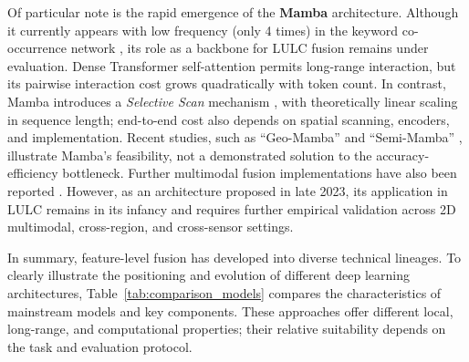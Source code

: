 \documentclass[]{interact}
\theoremstyle{plain}%
\theoremstyle{definition}
\theoremstyle{remark}
\DeclareRobustCommand{\DIFadd}[1]{{\protect\color{DIFaddcolor}\uwave{#1}}}
\DeclareRobustCommand{\DIFdel}[1]{{\protect\color{DIFdelcolor}\sout{#1}}}
\def\DIFadd#1{#1}%
\def\DIFdel#1{}%
\begin{document}
Of particular note is the rapid emergence of the \textbf{Mamba} architecture. Although it currently appears with low frequency (only 4 times) in the keyword co-occurrence network {\hypersetup{citecolor=red}\color{red}\citep{49,5,51,52}}, \DIFdel{it} \DIFdel{is} \DIFdel{positioning} \DIFdel{itself} \DIFadd{its} \DIFadd{role} as \DIFdel{the} \DIFdel{next-generation} \DIFadd{a} backbone \DIFdel{following} \DIFdel{CNN} \DIFdel{and} \DIFadd{for} \DIFadd{LULC} \DIFadd{fusion} \DIFadd{remains} \DIFadd{under} \DIFadd{evaluation}\DIFadd{.} \DIFadd{Dense} Transformer\DIFdel{.} \DIFdel{While} \DIFdel{Transformer} \DIFdel{possess} \DIFdel{superior} \DIFdel{global} \DIFdel{modeling} \DIFdel{capabilities} \DIFadd{self-attention} \DIFadd{permits} \DIFadd{long-range} \DIFadd{interaction}, \DIFdel{their} \DIFdel{computational} \DIFdel{complexity} \DIFadd{but} \DIFadd{its} \DIFadd{pairwise} \DIFadd{interaction} \DIFadd{cost} grows quadratically with \DIFdel{image} \DIFdel{resolution} \DIFadd{token} \DIFadd{count}. In contrast, Mamba introduces a \textit{Selective Scan} mechanism \citep{53}, \DIFdel{achieving} \DIFdel{a} \DIFdel{global} \DIFdel{receptive} \DIFdel{field} with \DIFadd{theoretically} linear \DIFdel{complexity} \DIFadd{scaling} \DIFadd{in} \DIFadd{sequence} \DIFadd{length}\DIFadd{;} \DIFadd{end-to-end} \DIFadd{cost} \DIFadd{also} \DIFadd{depends} \DIFadd{on} \DIFadd{spatial} \DIFadd{scanning}\DIFadd{,} \DIFadd{encoders}\DIFadd{,} \DIFadd{and} \DIFadd{implementation}. Recent studies, such as ``Geo-Mamba'' \citep{49} and ``Semi-Mamba'' \citep{51}, illustrate Mamba's \DIFdel{potential} \DIFdel{in} \DIFdel{breaking} \DIFadd{feasibility}\DIFadd{,} \DIFadd{not} \DIFadd{a} \DIFadd{demonstrated} \DIFadd{solution} \DIFadd{to} the accuracy-efficiency bottleneck\DIFadd{.} \DIFadd{Further} \DIFadd{multimodal} \DIFadd{fusion} \DIFadd{implementations} \DIFadd{have} \DIFadd{also} \DIFadd{been} \DIFadd{reported} {\color{blue}\citep{5,52}}. However, as an architecture proposed in late 2023, its application in LULC remains in its infancy and requires further empirical validation \DIFadd{across} \DIFadd{2D} \DIFadd{multimodal}\DIFadd{,} \DIFadd{cross-region}\DIFadd{,} \DIFadd{and} \DIFadd{cross-sensor} \DIFadd{settings}.

In summary, feature-level fusion has developed into diverse technical lineages. To clearly illustrate the positioning and evolution of different deep learning architectures, Table~\ref{tab:comparison_models} compares the characteristics of mainstream models and key components. \DIFdel{The} \DIFdel{technical} \DIFdel{focus} \DIFdel{is} \DIFdel{shifting} \DIFdel{from} \DIFdel{local-centric} \DIFdel{CNN} \DIFdel{toward} \DIFdel{global-centric} \DIFdel{Transformer} \DIFadd{These} \DIFadd{approaches} \DIFadd{offer} \DIFadd{different} \DIFadd{local}\DIFadd{,} \DIFadd{long-range}\DIFadd{,} and \DIFdel{efficiency-oriented} \DIFdel{architectures} \DIFdel{like} \DIFdel{Mamba} \DIFadd{computational} \DIFadd{properties}\DIFadd{;} \DIFadd{their} \DIFadd{relative} \DIFadd{suitability} \DIFadd{depends} \DIFadd{on} \DIFadd{the} \DIFadd{task} \DIFadd{and} \DIFadd{evaluation} \DIFadd{protocol}.
\end{document}
